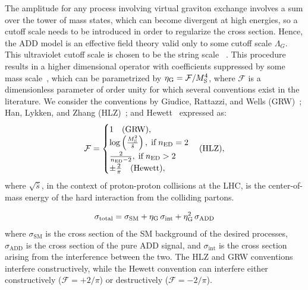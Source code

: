 The amplitude for any process involving virtual graviton exchange involves a sum over the \KK tower of \Gkk mass states, which can become divergent at high energies, so a cutoff scale needs to be introduced in order to regularize the cross section. Hence, the ADD model is an effective field theory valid only to some cutoff scale $\Lambda_{G}$. This ultraviolet cutoff scale is chosen to be the string scale \Ms~\cite{Han:1998sg}. This procedure results in a higher dimensional operator with coefficients suppressed by some mass scale~\cite{Gleisberg:2003ue}, which can be parametrized by $\eta_{\rm G} = \mathcal{F}/M_{\rm S}^4$, where $\mathcal{F}$ is a dimensionless parameter of order unity for which several conventions exist in the literature. We consider the conventions by Giudice, Rattazzi, and Wells (GRW)~\cite{Giudice:1998ck}; Han, Lykken, and Zhang (HLZ)~\cite{Han:1998sg}; and Hewett~\cite{Hewett:1998sn} expressed as:
\begin{equation}
	\label{eqn:add_f_conventions}
	\mathcal{F} = 
	\begin{cases} 
		1 \quad \text{(GRW)}, \\
		\log\left(\frac{M_{\rm S}^2}{\hat{s}} \right), \; \text{if} \; n_{\rm ED} = 2 \\ 
		\frac{2}{n_{\rm ED} - 2}, \; \text{if} \; n_{\rm ED} > 2 \\
		\pm\frac{2}{\pi} \quad \text{(Hewett)},
	\end{cases}
	\text{(HLZ)},
\end{equation}
where $\sqrt{\hat{s}}$, in the context of proton-proton collisions at the LHC, is the center-of-mass energy of the hard interaction from the colliding partons. 

\begin{equation}
	\sigma_{\mathrm{total}} = \sigma_{\mathrm{SM}} + \eta_{\rm G}\, \sigma_{\mathrm{int}} + \eta_{\rm G}^2\, \sigma_{\mathrm{ADD}}
\end{equation}
where $\sigma_{\mathrm{SM}}$ is the cross section of the SM background of the desired processes, $\sigma_{\mathrm{ADD}}$ is the cross section of the pure ADD signal, and $\sigma_{\mathrm{int}}$ is the cross section arising from the interference between the two. The HLZ and GRW conventions interfere constructively, while the Hewett convention can interfere either constructively ($\mathcal{F} = +2/\pi$) or destructively ($\mathcal{F} = -2/\pi$).

